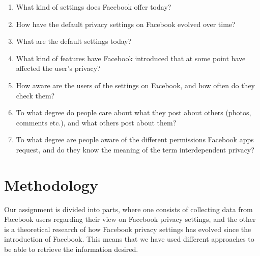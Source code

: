\begin{enumerate}
\item What kind of settings does Facebook offer today?
\item How have the default privacy settings on Facebook evolved over time?
\item What are the default settings today?
\item What kind of features have Facebook introduced that at some point have affected the user's privacy?
\item How aware are the users of the settings on Facebook, and how often do they check them?
\item To what degree do people care about what they post about others (photos, comments etc.), and what others post about them? 
\item To what degree are people aware of the different permissions Facebook apps request, and do they know the meaning of the term interdependent privacy?
\end{enumerate}



\section{Methodology}
\label{sec:methodology}
Our assignment is divided into parts, where one consists of collecting data from Facebook users regarding their view on Facebook privacy settings, and the other is a theoretical research of how Facebook privacy settings has evolved since the introduction of Facebook. This means that we have used different approaches to be able to retrieve the information desired.

